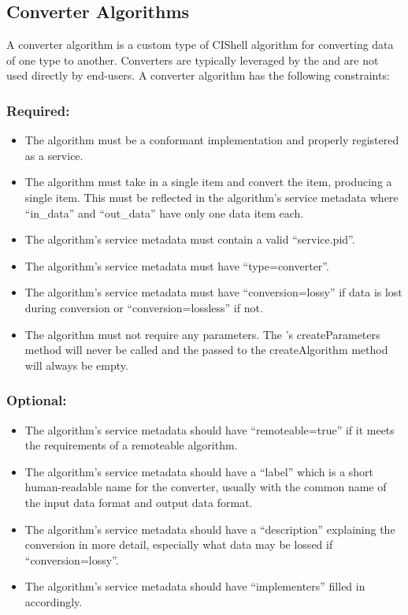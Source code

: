 \subsection{Converter Algorithms}
\label{converterAlg}

A converter algorithm is a custom type of CIShell algorithm for converting data
of one type to another. Converters are typically leveraged by the
 and are not used directly by end-users. A converter
algorithm has the following constraints:

\subsubsection*{Required:}
\begin{itemize}
  \item The algorithm must be a conformant 
  implementation and properly registered as a service.
  \item The algorithm must take in a single  item and convert the
  item, producing a single  item. This must be reflected in the
  algorithm's service metadata where ``in\_data'' and ``out\_data'' have only
  one data item each.
  \item The algorithm's service metadata must contain a valid ``service.pid''.
  \item The algorithm's service metadata must have ``type=converter''.
  \item The algorithm's service metadata must have ``conversion=lossy'' if
  data is lost during conversion or ``conversion=lossless'' if not.
  \item The algorithm must not require any parameters. The
  's createParameters method will never be called and
  the  passed to the createAlgorithm method will always be
  empty.
\end{itemize}

\subsubsection*{Optional:}
\begin{itemize}an
  \item The algorithm's service metadata should have ``remoteable=true'' if it
  meets the requirements of a remoteable algorithm.
  \item The algorithm's service metadata should have a ``label'' which is a
  short human-readable name for the converter, usually with the common name of
  the input data format and output data format.
  \item The algorithm's service metadata should have a ``description''
  explaining the conversion in more detail, especially what data may be lossed
  if ``conversion=lossy''.
  \item The algorithm's service metadata should have ``implementers'' filled
  in accordingly.  
\end{itemize}

